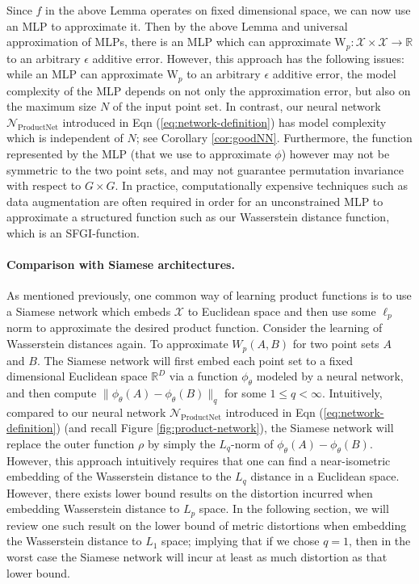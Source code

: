 \documentclass[12pt]{article}
\newcommand{\R}{\mathbb R}
\newcommand{\Network}{\mathcal{N}_{\mathrm{ProductNet}}}
\newcommand{\SFGI} {{SFGI}}
\begin{document}
Since $f$ in the above Lemma operates on fixed dimensional space, we can now use an MLP to approximate it. Then by the above Lemma and universal approximation of MLPs, there is an MLP which can approximate
$\mathrm{W}_p: \mathcal{X} \times \mathcal{X} \to \R$ to an arbitrary $\epsilon$ additive error. 
However, this approach has the following issues: 
while an MLP can approximate $\mathrm{W}_p$ to an arbitrary $\epsilon$ additive error, the model complexity of the MLP depends on not only the approximation error, but also on the maximum size $N$ of the input point set. In contrast, our neural network $\Network$ introduced in Eqn (\ref{eq:network-definition}) has model complexity which is independent of $N$; see Corollary \ref{cor:goodNN}. 
Furthermore, the function represented by the MLP (that we use to approximate $\phi$) however may not be symmetric to the two point sets, and may not guarantee permutation invariance with respect to $G \times G$. In practice, computationally expensive techniques such as data augmentation are often required in order for an unconstrained MLP to approximate a structured function such as our Wasserstein distance function, which is an \SFGI-function. 

\paragraph{Comparison with Siamese architectures.} 
As mentioned previously, one common way of learning product functions is to use a Siamese network which embeds $\mathcal{X}$ to Euclidean space and then use some $\ell_p$ norm to approximate the desired product function.
Consider the learning of Wasserstein distances again. 
To approximate $W_p(A, B)$ for two point sets $A$ and $B$. 
The Siamese network will first embed each point set to a fixed dimensional Euclidean space $\R^D$ via a function $\phi_\theta$ modeled by a neural network, and then compute $\|\phi_\theta(A) - \phi_\theta(B)\|_q$ for some $1\le q < \infty$. 
Intuitively, compared to our neural network $\Network$ introduced in Eqn (\ref{eq:network-definition}) (and recall Figure \ref{fig:product-network}), the Siamese network will replace the outer function $\rho$ by simply the $L_q$-norm of $\phi_\theta(A) - \phi_\theta(B)$. 
However, this approach intuitively requires that one can find a near-isometric embedding of the Wasserstein distance to the $L_q$ distance in a Euclidean space. 
However, there exists lower bound results on the distortion incurred when embedding Wasserstein distance to $L_p$ space. In the following section, we will review one such result on the lower bound of metric distortions when embedding the Wasserstein distance to $L_1$ space; implying that if we chose $q=1$, then in the worst case the Siamese network will incur at least as much distortion as that lower bound. 
\end{document}
